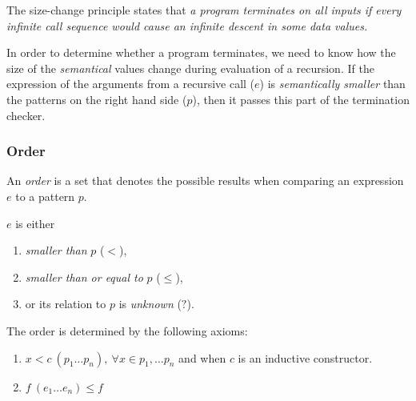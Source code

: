 The size-change principle states that \emph{a program terminates on all inputs if every infinite call sequence would cause an infinite descent in some data values.}

In order to determine whether a program terminates, we need to know how the size of the \emph{semantical} values change during evaluation of a recursion. If the expression of the arguments from a recursive call ($e$) is \emph{semantically smaller} than the patterns on the right hand side ($p$), then it passes this part of the termination checker.

\subsubsection{Order}

An \emph{order} is a set that denotes the possible results when comparing an expression $e$ to a pattern $p$.

$e$ is either

\begin{enumerate}
  \item \emph{smaller than} $p$ ($\boldsymbol{<}$),
  \item \emph{smaller than or equal to} $p$ ($\boldsymbol{\leq}$),
  \item or its relation to $p$ is \emph{unknown} ($\boldsymbol{?}$).
\end{enumerate}

The order is determined by the following axioms:

\begin{enumerate}
  \item $x < c \: (p_1 \dots p_n), \: \forall x \in {p_1, \dots p_n}$ and when $c$ is an inductive constructor.
  \item $f \: (e_1 \dots e_n) \leq f$
\end{enumerate}

